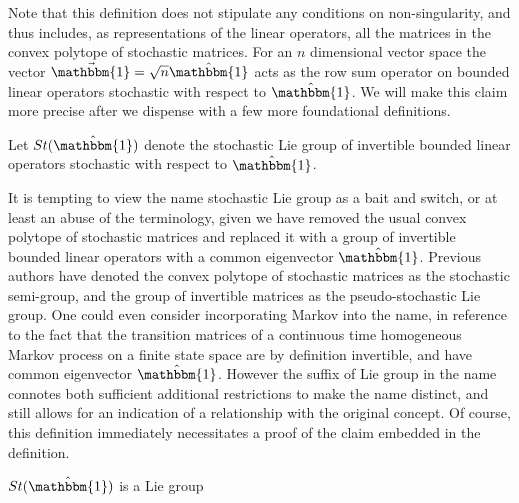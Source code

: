 Note that this definition does not stipulate any conditions on non-singularity,
and thus includes, as representations of the linear operators, all the matrices 
in the convex polytope of stochastic matrices. For an $n$ dimensional vector 
space the vector $\vec{\mathbbm{1}} = \sqrt{n} \hat{\mathbbm{1}}$ acts as the 
row sum operator on bounded linear operators stochastic with respect to $\hat{\mathbbm{1}}$. 
We will make this claim more precise after we dispense with a few more 
foundational definitions.

\begin{definition}
	Let $St(\hat{\mathbbm{1}})$ denote the stochastic Lie group of invertible 
	bounded linear operators stochastic with respect to $\hat{\mathbbm{1}}$.
\end{definition}

It is tempting to view the name stochastic Lie group as a bait and switch, or 
at least an abuse of the terminology, given we have removed the usual convex
polytope of stochastic matrices and replaced it with a group of invertible 
bounded linear operators with a common eigenvector $\hat{\mathbbm{1}}$. Previous 
authors have denoted the convex polytope of stochastic matrices as the 
stochastic semi-group, and the group of invertible matrices as the 
pseudo-stochastic Lie group. One could even consider incorporating Markov into 
the name, in reference to the fact that the transition matrices of a continuous 
time homogeneous Markov process on a finite state space are by definition 
invertible, and have common eigenvector $\hat{\mathbbm{1}}$. However the suffix 
of Lie group in the name connotes both sufficient additional restrictions to 
make the name distinct, and still allows for an indication of a relationship 
with the original concept. Of course, this definition immediately necessitates a
proof of the claim embedded in the definition.

\begin{lemma}
	$St(\hat{\mathbbm{1}})$ is a Lie group
\end{lemma}


